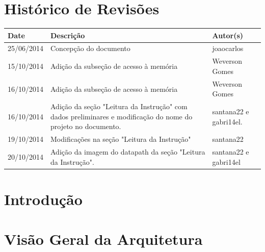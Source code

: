\documentclass{report}
\begin{document}
\capa
%

\chapter*{Histórico de Revisões}
  \vspace*{1cm}
  \begin{table}[ht]
    \centering
    \begin{tabular}[pos]{|m{2cm} | m{8cm} | m{4cm}|} 
      \hline
      \cellcolor[gray]{0.9}
      \textbf{Date} & \cellcolor[gray]{0.9}\textbf{Descrição} & \cellcolor[gray]{0.9}\textbf{Autor(s)}\\
      \hline
      25/06/2014 & Concepção do documento & joaocarlos \\ \hline
      15/10/2014 & Adição da subseção de acesso à memória & Weverson Gomes \\ \hline
      16/10/2014 & Adição da subseção de acesso à memória & Weverson Gomes \\ \hline
      16/10/2014 & Adição da seção "Leitura da Instrução" com dados preliminares e modificação do nome do projeto no documento. & santana22 e gabri14el.\\ \hline
      19/10/2014 & Modificações na seção "Leitura da Instrução" & santana22 \\ \hline
      20/10/2014 & Adição da imagem do datapath da seção "Leitura da Instrução". & santana22 e gabri14el \\ \hline
    \end{tabular}
  \end{table}

\tableofcontents

\chapter{Introdução}
  
	

\chapter{Visão Geral da Arquitetura}
\end{document}
